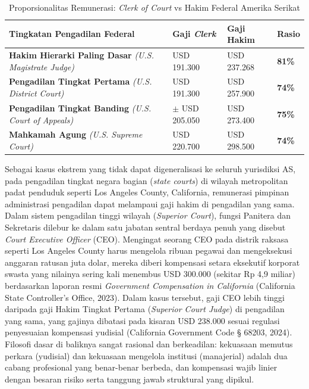 \documentclass[12pt, a4paper]{article}
\begin{document}
\begin{table}[H]
\centering
\fontsize{10}{12}\selectfont
\caption{Proporsionalitas Remunerasi: \textit{Clerk of Court} vs Hakim Federal Amerika Serikat}
\label{tab:komparasi-usa}
\renewcommand{\arraystretch}{1.4}
\begin{tabular}{p{5.5cm} p{3.0cm} p{3.5cm} p{2.0cm}}
\hline
\textbf{Tingkatan Pengadilan Federal} & \textbf{Gaji \textit{Clerk}} & \textbf{Gaji Hakim} & \textbf{Rasio} \\
\hline
\raggedright\textbf{Hakim Hierarki Paling Dasar} \newline \textit{(U.S. Magistrate Judge)} & USD 191.300 & USD 237.268 & \textbf{81\%} \\
\raggedright\textbf{Pengadilan Tingkat Pertama} \newline \textit{(U.S. District Court)} & USD 191.300 & USD 257.900 & \textbf{74\%} \\
\raggedright\textbf{Pengadilan Tingkat Banding} \newline \textit{(U.S. Court of Appeals)} & $\pm$ USD 205.050 & USD 273.400 & \textbf{75\%} \\
\raggedright\textbf{Mahkamah Agung} \newline \textit{(U.S. Supreme Court)} & USD 220.700 & USD 298.500 & \textbf{74\%} \\
\hline
\end{tabular}
\end{table}

Sebagai kasus ekstrem yang tidak dapat digeneralisasi ke seluruh yurisdiksi AS, pada pengadilan tingkat negara bagian (\textit{state courts}) di wilayah metropolitan padat penduduk seperti Los Angeles County, California, remunerasi pimpinan administrasi pengadilan dapat melampaui gaji hakim di pengadilan yang sama. Dalam sistem pengadilan tinggi wilayah (\textit{Superior Court}), fungsi Panitera dan Sekretaris dilebur ke dalam satu jabatan sentral berdaya penuh yang disebut \textit{Court Executive Officer} (CEO). Mengingat seorang CEO pada distrik raksasa seperti Los Angeles County harus mengelola ribuan pegawai dan mengeksekusi anggaran ratusan juta dolar, mereka diberi kompensasi setara eksekutif korporat swasta yang nilainya sering kali menembus USD 300.000 (sekitar Rp 4,9 miliar) berdasarkan laporan resmi \textit{Government Compensation in California} (California State Controller's Office, 2023). Dalam kasus tersebut, gaji CEO lebih tinggi daripada gaji Hakim Tingkat Pertama (\textit{Superior Court Judge}) di pengadilan yang sama, yang gajinya dibatasi pada kisaran USD 238.000 sesuai regulasi penyesuaian kompensasi yudisial (California Government Code § 68203, 2024). Filosofi dasar di baliknya sangat rasional dan berkeadilan: kekuasaan memutus perkara (yudisial) dan kekuasaan mengelola institusi (manajerial) adalah dua cabang profesional yang benar-benar berbeda, dan kompensasi wajib linier dengan besaran risiko serta tanggung jawab struktural yang dipikul.
\end{document}
